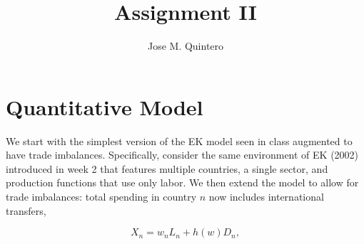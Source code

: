 \documentclass[12pt,oneside,reqno]{article}
\title{Assignment II}
\author{Jose M. Quintero}
\begin{document}
\maketitle 
\section{Quantitative Model}

We start with the simplest version of the EK model seen in class augmented to have trade imbalances. Specifically, consider the same environment of EK (2002) introduced in week 2 that features multiple countries, a single sector, and production functions that use only labor. We then extend the model to allow for trade imbalances: total spending in country $n$ now includes international transfers,

\begin{equation*}
X_{n}=w_{n} L_{n}+h(w) D_{n},
\end{equation*}
\end{document}
